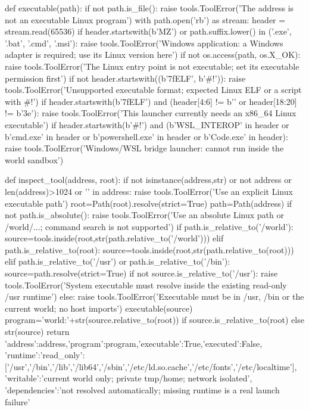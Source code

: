 def executable(path):
    if not path.is_file():
        raise tools.ToolError('The address is not an executable Linux program')
    with path.open('rb') as stream:
        header = stream.read(65536)
    if header.startswith(b'MZ') or path.suffix.lower() in ('.exe', '.bat', '.cmd', '.msi'):
        raise tools.ToolError('Windows application: a Windows adapter is required; use its Linux version here')
    if not os.access(path, os.X_OK):
        raise tools.ToolError('The Linux entry point is not executable; set its executable permission first')
    if not header.startswith((b'\x7fELF', b'#!')):
        raise tools.ToolError('Unsupported executable format; expected Linux ELF or a script with #!')
    if header.startswith(b'\x7fELF') and (header[4:6] != b'' or header[18:20] != b'\x3e'):
        raise tools.ToolError('This launcher currently needs an x86_64 Linux executable')
    if header.startswith(b'#!') and (b'WSL_INTEROP' in header or b'cmd.exe' in header or b'powershell.exe' in header or b'Code.exe' in header):
        raise tools.ToolError('Windows/WSL bridge launcher: cannot run inside the world sandbox')


def inspect_tool(address, root):
    if not isinstance(address,str) or not address or len(address)>1024 or '\0' in address:
        raise tools.ToolError('Use an explicit Linux executable path')
    root=Path(root).resolve(strict=True)
    path=Path(address)
    if not path.is_absolute():
        raise tools.ToolError('Use an absolute Linux path or /world/...; command search is not supported')
    if path.is_relative_to('/world'):
        source=tools.inside(root,str(path.relative_to('/world')))
    elif path.is_relative_to(root):
        source=tools.inside(root,str(path.relative_to(root)))
    elif path.is_relative_to('/usr') or path.is_relative_to('/bin'):
        source=path.resolve(strict=True)
        if not source.is_relative_to('/usr'):
            raise tools.ToolError('System executable must resolve inside the existing read-only /usr runtime')
    else:
        raise tools.ToolError('Executable must be in /usr, /bin or the current world; no host imports')
    executable(source)
    program='world:'+str(source.relative_to(root)) if source.is_relative_to(root) else str(source)
    return {'address':address,'program':program,'executable':True,'executed':False,
            'runtime':{'read_only':['/usr','/bin','/lib','/lib64','/sbin','/etc/ld.so.cache','/etc/fonts','/etc/localtime'],
                       'writable':'current world only; private tmp/home; network isolated',
                       'dependencies':'not resolved automatically; missing runtime is a real launch failure'}}


